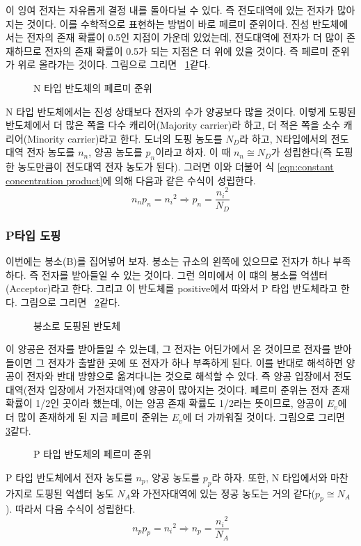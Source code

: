 이 잉여 전자는 자유롭게 결정 내를 돌아다닐 수 있다. 즉 전도대역에 있는 전자가 많아지는 것이다.
이를 수학적으로 표현하는 방법이 바로 페르미 준위이다. 진성 반도체에서는 전자의 존재 확률이 0.5인 지점이 가운데 있었는데, 전도대역에 전자가 더 많이 존재하므로 전자의 존재 확률이 0.5가 되는 지점은 더 위에 있을 것이다.
즉 페르미 준위가 위로 올라가는 것이다.
그림으로 그리면 \figurename~\ref{fig:n type fermi level}\과 같다.
\begin{figure}[!tbp]
    \centering
    \caption{N 타입 반도체의 페르미 준위}\label{fig:n type fermi level}
\end{figure}
N 타입 반도체에서는 진성 상태보다 전자의 수가 양공보다 많을 것이다. 이렇게 도핑된 반도체에서 더 많은 쪽을 다수 캐리어(Majority carrier)라 하고, 더 적은 쪽을 소수 캐리어(Minority carrier)라고 한다.
도너의 도핑 농도를 $N_D$라 하고, N타입에서의 전도대역 전자 농도를 $n_n$, 양공 농도를 $p_n$이라고 하자. 이 때 $n_n\cong N_D$가 성립한다(즉 도핑한 농도만큼이 전도대역 전자 농도가 된다). 그러면 이와 더불어 식 \ref{eqn:constant concentration product}에 의해 다음과 같은 수식이 성립한다.
\begin{equation}
    n_n p_n={n_i}^2 \Rightarrow p_n=\frac{{n_i}^2}{N_D}
\end{equation}

\subsubsection{P타입 도핑}
이번에는 붕소(B)를 집어넣어 보자. 붕소는 규소의 왼쪽에 있으므로 전자가 하나 부족하다. 즉 전자를 받아들일 수 있는 것이다. 그런 의미에서 이 떄의 붕소를 억셉터(Acceptor)라고 한다. 그리고 이 반도체를 positive에서 따와서 P 타입 반도체라고 한다.
그림으로 그리면 \figurename~\ref{fig:Boron doping}\과 같다.
\begin{figure}[!hbp]
    \centering
    \caption{붕소로 도핑된 반도체}\label{fig:Boron doping}
\end{figure}

이 양공은 전자를 받아들일 수 있는데, 그 전자는 어딘가에서 온 것이므로 전자를 받아들이면 그 전자가 출발한 곳에 또 전자가 하나 부족하게 된다. 이를 반대로 해석하면 양공이 전자와 반대 방향으로 옮겨다니는 것으로 해석할 수 있다.
즉 양공 입장에서 전도대역(전자 입장에서 가전자대역)에 양공이 많아지는 것이다. 페르미 준위는 전자 존재 확률이 1/2인 곳이라 했는데, 이는 양공 존재 확률도 1/2라는 뜻이므로, 양공이 $E_v$에 더 많이 존재하게 된 지금 페르미 준위는 $E_v$에 더 가까워질 것이다.
그림으로 그리면 \figurename~ \ref{fig:p type fermi level}\과 같다.
\begin{figure}[!tpb]
    \centering
    \caption{P 타입 반도체의 페르미 준위}\label{fig:p type fermi level}
\end{figure}
P 타입 반도체에서 전자 농도를 $n_p$, 양공 농도를 $p_p$라 하자. 또한, N 타입에서와 마찬가지로 도핑된 억셉터 농도 $N_A$와 가전자대역에 있는 정공 농도는 거의 같다($p_p\cong N_A$). 따라서 다음 수식이 성립한다.
\begin{equation}
    n_p p_p={n_i}^2 \Rightarrow n_p=\frac{{n_i}^2}{N_A}
\end{equation}

